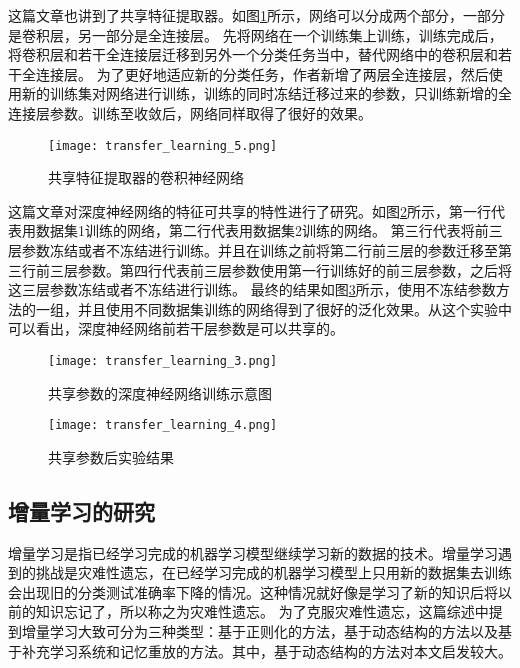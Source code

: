 这篇文章\cite{Oquab_2014_CVPR}也讲到了共享特征提取器。如图\ref{fig:transfer_learning_5}所示，网络可以分成两个部分，一部分是卷积层，另一部分是全连接层。
先将网络在一个训练集上训练，训练完成后，将卷积层和若干全连接层迁移到另外一个分类任务当中，替代网络中的卷积层和若干全连接层。
为了更好地适应新的分类任务，作者新增了两层全连接层，然后使用新的训练集对网络进行训练，训练的同时冻结迁移过来的参数，只训练新增的全连接层参数。训练至收敛后，网络同样取得了很好的效果。 
\begin{figure}
    \centering
    \texttt{[image: transfer\_learning\_5.png]}
    \caption{共享特征提取器的卷积神经网络\cite{Oquab_2014_CVPR}}
    \label{fig:transfer_learning_5}
\end{figure}

这篇文章\cite{yosinski_2014_NIPS}对深度神经网络的特征可共享的特性进行了研究。如图\ref{fig:transfer_learning_3}所示，第一行代表用数据集1训练的网络，第二行代表用数据集2训练的网络。
第三行代表将前三层参数冻结或者不冻结进行训练。并且在训练之前将第二行前三层的参数迁移至第三行前三层参数。第四行代表前三层参数使用第一行训练好的前三层参数，之后将这三层参数冻结或者不冻结进行训练。
最终的结果如图\ref{fig:transfer_learning_4}所示，使用不冻结参数方法的一组，并且使用不同数据集训练的网络得到了很好的泛化效果。从这个实验中可以看出，深度神经网络前若干层参数是可以共享的。
\begin{figure}
    \centering
    \texttt{[image: transfer\_learning\_3.png]}
    \caption{共享参数的深度神经网络训练示意图\cite{yosinski_2014_NIPS}}
    \label{fig:transfer_learning_3}
\end{figure}
\begin{figure}
    \centering
    \texttt{[image: transfer\_learning\_4.png]}
    \caption{共享参数后实验结果\cite{yosinski_2014_NIPS}}
    \label{fig:transfer_learning_4}
\end{figure}

\subsection{增量学习的研究}
增量学习是指已经学习完成的机器学习模型继续学习新的数据的技术。增量学习遇到的挑战是灾难性遗忘，在已经学习完成的机器学习模型上只用新的数据集去训练会出现旧的分类测试准确率下降的情况。这种情况就好像是学习了新的知识后将以前的知识忘记了，所以称之为灾难性遗忘。
为了克服灾难性遗忘，这篇综述\cite{PARISI201954}中提到增量学习大致可分为三种类型：基于正则化的方法，基于动态结构的方法以及基于补充学习系统和记忆重放的方法。其中，基于动态结构的方法对本文启发较大。

